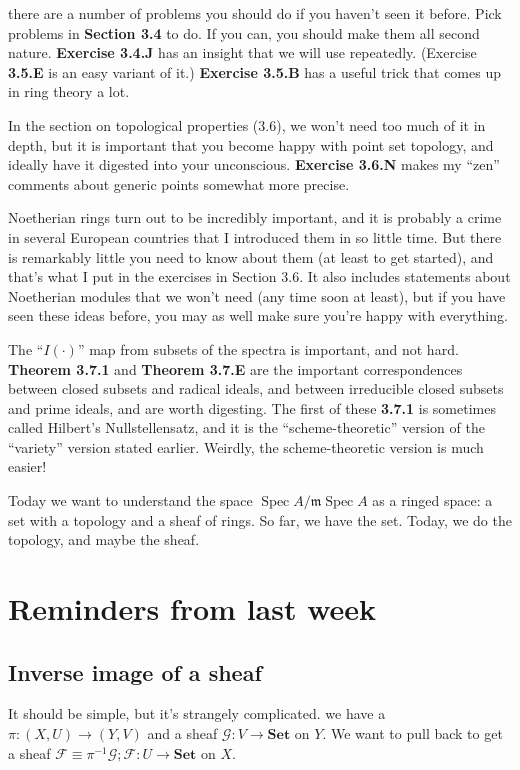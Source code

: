 \documentclass{book}
\newcommand{\F}{\ensuremath{\mathcal{F}}}
\newcommand{\G}{\ensuremath{\mathcal{G}}}
\newcommand{\spec}{\operatorname{Spec}}
\newcommand{\m}{\mathfrak{m}}
\newcommand{\mspec}{\m\operatorname{Spec}}
\newcommand{\Set}{\ensuremath{\mathbf{Set}}}
\theoremstyle{definition}
\begin{document}
\begin{itemize}
     there are a number of problems you should do if you
    haven’t seen it before. Pick problems in \textbf{Section 3.4} to do.
    If you can, you should make them all second nature. \textbf{Exercise 3.4.J}
    has an insight that we will use repeatedly. (Exercise \textbf{3.5.E} is an
    easy variant of it.) \textbf{Exercise 3.5.B} has a useful trick that comes
    up in ring theory a lot.

    In the section on topological properties (3.6), we won’t need too much of it in
    depth, but it is important that you become happy with point set topology, and
    ideally have it digested into your unconscious. \textbf{Exercise 3.6.N} makes my ``zen''
    comments about generic points somewhat more precise.

    Noetherian rings turn out to be incredibly important, and it is probably a
    crime in several European countries that I introduced them in so little
    time. But there is remarkably little you need to know about them (at least
    to get started), and that’s what I put in the exercises in Section 3.6. It
    also includes statements about Noetherian modules that we won’t need (any
    time soon at least), but if you have seen these ideas before, you may as
    well make sure you’re happy with everything.

    The ``$I(\cdot)$'' map from subsets of the spectra is important, and not hard.
    \textbf{Theorem 3.7.1} and \textbf{Theorem 3.7.E} are the important
    correspondences between closed subsets and radical ideals, and between
    irreducible closed subsets and prime ideals, and are worth digesting. The first
    of these \textbf{3.7.1} is sometimes called Hilbert’s Nullstellensatz, and
    it is the ``scheme-theoretic'' version of the ``variety'' version stated
    earlier. Weirdly, the scheme-theoretic version is much easier!
\end{itemize}

Today we want to understand the space $\spec A / \mspec A$
as a ringed space: a set with a topology and a
sheaf of rings. So far, we have the set.
Today, we do the topology, and maybe the sheaf.

\section{Reminders from last week}
\subsection{Inverse image of a sheaf}
It should be simple, but it's strangely complicated.
we have a $\pi: (X, U) \rightarrow (Y, V)$ and a sheaf
$\G: V \rightarrow \Set$ on $Y$. We want to pull back to get
a sheaf $\F \equiv \pi^{-1}\G; \F : U \rightarrow \Set$ on $X$.
\end{document}
